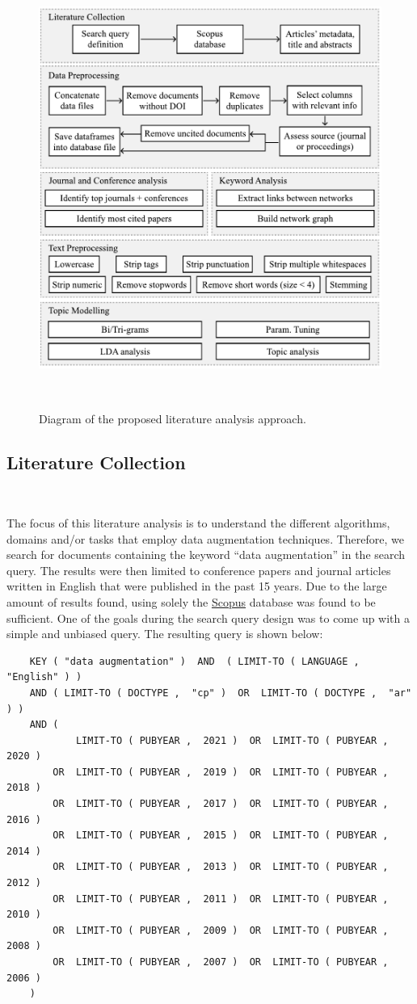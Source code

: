 \documentclass[parskip=full]{scrartcl}
\begin{document}
\begin{figure}[H]
	\centering
	\includegraphics[width=.75\linewidth]{../analysis/slr_diagram}
    \caption{Diagram of the proposed literature analysis approach.
    }~\label{fig:slr_diagram}
\end{figure}

\subsection{Literature Collection}~\label{sec:lit_collection}

The focus of this literature analysis is to understand the different
algorithms, domains and/or tasks that employ data augmentation techniques.
Therefore, we search for documents containing the keyword ``data
augmentation'' in the search query. The results were then limited to
conference papers and journal articles written in English that were published
in the past 15 years.  Due to the large amount of results found, using solely
the \href{https://www.scopus.com/}{Scopus} database was found to be
sufficient. One of the goals during the search query design was to come up
with a simple and unbiased query. The resulting query is shown below:

\begin{verbatim}
    KEY ( "data augmentation" )  AND  ( LIMIT-TO ( LANGUAGE ,  "English" ) )  
    AND ( LIMIT-TO ( DOCTYPE ,  "cp" )  OR  LIMIT-TO ( DOCTYPE ,  "ar" ) )  
    AND (
            LIMIT-TO ( PUBYEAR ,  2021 )  OR  LIMIT-TO ( PUBYEAR ,  2020 )  
        OR  LIMIT-TO ( PUBYEAR ,  2019 )  OR  LIMIT-TO ( PUBYEAR ,  2018 )  
        OR  LIMIT-TO ( PUBYEAR ,  2017 )  OR  LIMIT-TO ( PUBYEAR ,  2016 )  
        OR  LIMIT-TO ( PUBYEAR ,  2015 )  OR  LIMIT-TO ( PUBYEAR ,  2014 )  
        OR  LIMIT-TO ( PUBYEAR ,  2013 )  OR  LIMIT-TO ( PUBYEAR ,  2012 )  
        OR  LIMIT-TO ( PUBYEAR ,  2011 )  OR  LIMIT-TO ( PUBYEAR ,  2010 )  
        OR  LIMIT-TO ( PUBYEAR ,  2009 )  OR  LIMIT-TO ( PUBYEAR ,  2008 )  
        OR  LIMIT-TO ( PUBYEAR ,  2007 )  OR  LIMIT-TO ( PUBYEAR ,  2006 ) 
    )  
\end{verbatim}
\end{document}
